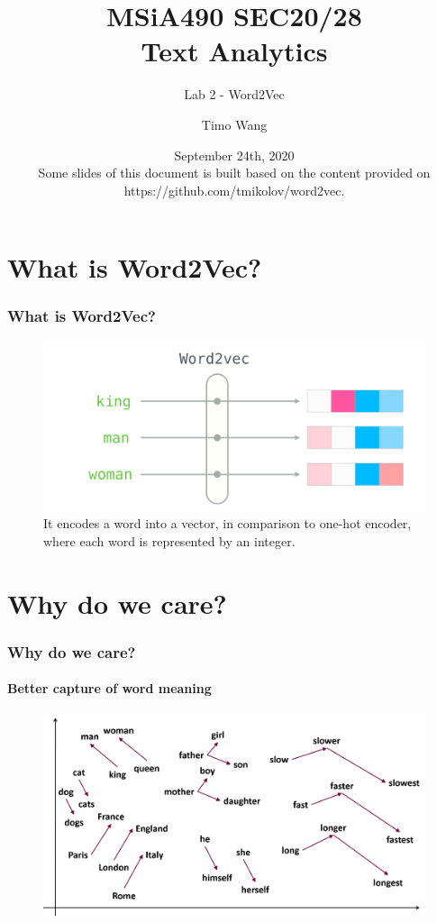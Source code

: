 \documentclass{beamer}
\begin{document}
\title{MSiA490 SEC20/28\\ Text Analytics}
\subtitle{Lab 2 - Word2Vec}
\author{Timo Wang}
\date{September 24th, 2020 \\
{\footnotesize Some slides of this document is built based on the content provided on https://github.com/tmikolov/word2vec.}}

\begin{frame}
    \titlepage
\end{frame}


\section{What is Word2Vec?}
\begin{frame}
    \frametitle{What is Word2Vec?}
    \begin{figure}
        \includegraphics[scale=0.5]{what-is-word2vec}
        \caption{It encodes a word into a vector, in comparison to one-hot encoder, where each word is represented by an integer.}
    \end{figure}
\end{frame}


\section{Why do we care?}
\begin{frame}
    \frametitle{Why do we care?}
    \framesubtitle{Better capture of word meaning}
    \begin{figure}
        \includegraphics[scale=0.5]{why-word2vec-1}
    \end{figure}
\end{frame}
\end{document}
